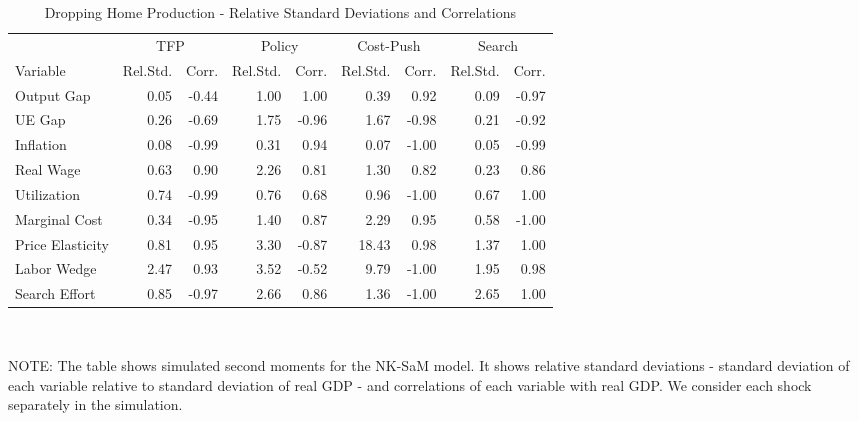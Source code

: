 \documentclass[12pt,3p,authoryear,review]{elsarticle}
\begin{document}
\begin{table}[h!]%
	\begin{center}%
		\begin{footnotesize}%
			\caption{Dropping Home Production - Relative Standard Deviations and Correlations}\label{tab:app_robust_hw}%
			\begin{tabular}{l r r r r r r r r}%
				\hline%
				& \multicolumn{2}{c}{TFP} & \multicolumn{2}{c}{Policy} & \multicolumn{2}{c}{Cost-Push} & \multicolumn{2}{c}{Search}\\%
				Variable & Rel.Std. & Corr. & Rel.Std. & Corr. & Rel.Std. & Corr. & Rel.Std. & Corr.\\%
				\hline \hline%
				Output Gap & 0.05 & -0.44 & 1.00 & 1.00 & 0.39 & 0.92 & 0.09 & -0.97\\%
				UE Gap & 0.26 & -0.69 & 1.75 & -0.96 & 1.67 & -0.98 & 0.21 & -0.92\\%
				Inflation & 0.08 & -0.99 & 0.31 & 0.94 & 0.07 & -1.00 & 0.05 & -0.99\\%
				Real Wage & 0.63 & 0.90 & 2.26 & 0.81 & 1.30 & 0.82 & 0.23 & 0.86\\%
				Utilization & 0.74 & -0.99 & 0.76 & 0.68 & 0.96 & -1.00 & 0.67 & 1.00\\%
				Marginal Cost & 0.34 & -0.95 & 1.40 & 0.87 & 2.29 & 0.95 & 0.58 & -1.00\\%
				Price Elasticity & 0.81 & 0.95 & 3.30 & -0.87 & 18.43 & 0.98 & 1.37 & 1.00\\%
				Labor Wedge & 2.47 & 0.93 & 3.52 & -0.52 & 9.79 & -1.00 & 1.95 & 0.98\\%
				Search Effort & 0.85 & -0.97 & 2.66 & 0.86 & 1.36 & -1.00 & 2.65 & 1.00\\%
				\hline%
			\end{tabular}\\%
			\vspace{0.1in}%
			{\tiny NOTE: The table shows simulated second moments for the NK-SaM model. It shows relative standard deviations - standard deviation of each variable relative to standard deviation of real GDP - and correlations of each variable with real GDP. We consider each shock separately in the simulation.\par}%
		\end{footnotesize}%
	\end{center}%
\end{table}%
\end{document}
